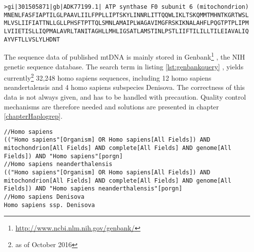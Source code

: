 {\small 
\begin{lstlisting}[caption= {Example of a FASTA protein sequence - here the complete ATP-6 gene}, label={lst:fastaAAC}]
>gi|301505871|gb|ADK77199.1| ATP synthase F0 subunit 6 (mitochondrion)
MNENLFASFIAPTILGLPAAVLIILFPPLLIPTSKYLINNRLITTQQWLIKLTSKQMMTMHNTKGRTWSL
MLVSLIIFIATTNLLGLLPHSFTPTTQLSMNLAMAIPLWAGAVIMGFRSKIKNALAHFLPQGTPTPLIPM
LVIIETISLLIQPMALAVRLTANITAGHLLMHLIGSATLAMSTINLPSTLIIFTILILLTILEIAVALIQ
AYVFTLLVSLYLHDNT
\end{lstlisting}
}
The sequence data of published mtDNA is mainly stored in Genbank\footnote{\url{http://www.ncbi.nlm.nih.gov/genbank/}} \cite{Benson2005}, the NIH genetic sequence database. The search term in listing \ref{lst:genbankquery} , yields currently\footnote{as of October 2016} 32,248 homo sapiens sequences, including 12 homo sapiens neandertalensis and 4 homo sapiens subspecies Denisova. 
The correctness of this data is not always given, and has to be handled with precaution. Quality control mechanisms are therefore needed and solutions are presented in chapter \ref{chapterHaplogrep}. 
\begin{lstlisting}[caption={GenBank queries for mtDNA sequences}, label={lst:genbankquery}]
//Homo sapiens
(("Homo sapiens"[Organism] OR Homo sapiens[All Fields]) AND mitochondrion[All Fields] AND complete[All Fields] AND genome[All Fields]) AND "Homo sapiens"[porgn]
//Homo sapiens neanderthalensis
(("Homo sapiens"[Organism] OR Homo sapiens[All Fields]) AND mitochondrion[All Fields] AND complete[All Fields] AND genome[All Fields]) AND "Homo sapiens neanderthalensis"[porgn] 
//Homo sapiens Denisova
Homo sapiens ssp. Denisova 
\end{lstlisting}
